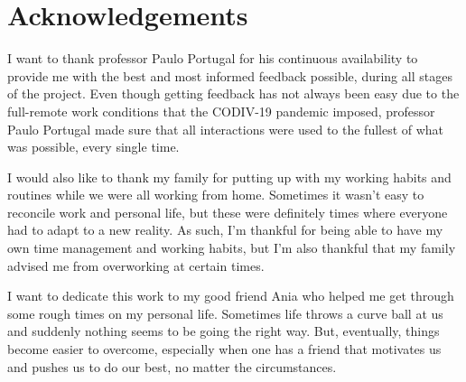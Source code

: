 \chapter*{Acknowledgements}
I want to thank professor Paulo Portugal for his continuous availability  to provide me with the best and most informed feedback possible, during all stages of the project.
Even though getting feedback has not always been easy due to the full-remote work conditions that the CODIV-19 pandemic imposed, professor Paulo Portugal made sure that all interactions were used to the fullest of what was possible, every single time.

\bigskip
I would also like to thank my family for putting up with my working habits and routines while we were all working from home.
Sometimes it wasn't easy to reconcile work and personal life, but these were definitely times where everyone had to adapt to a new reality.
As such, I'm thankful for being able to  have my own time management and working habits, but I'm also thankful that my family advised me from overworking at certain times.

\bigskip
I want to dedicate this work to my good friend Ania who helped me get through some rough times on my personal life.
Sometimes life throws a curve ball at us and suddenly nothing seems to be going the right way.
But, eventually, things become easier to overcome, especially when one has a friend that motivates us and pushes us to do our best, no matter the circumstances.

\vspace{10mm}
